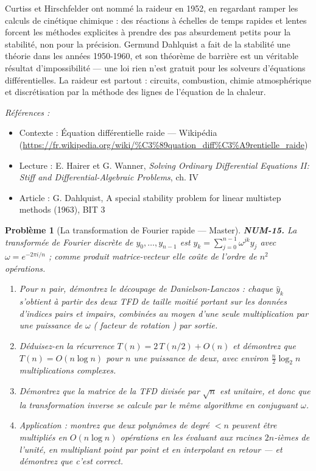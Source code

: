 \documentclass[11pt]{article}
\newtheorem{problem}{Problème}
\newenvironment{refs}{\par\small\noindent\emph{Références :}\begin{itemize}\setlength\itemsep{0pt}}{\end{itemize}\normalsize}
\begin{document}
\noindent Curtiss et Hirschfelder ont nommé la raideur en 1952, en regardant
ramper les calculs de cinétique chimique : des réactions à échelles de temps rapides et
lentes forcent les méthodes explicites à prendre des pas absurdement petits pour la
stabilité, non pour la précision. Germund Dahlquist a fait de la stabilité une théorie
dans les années 1950-1960, et son théorème de barrière est un véritable résultat
d'impossibilité --- une loi \og{} rien n'est gratuit \fg{} pour les solveurs d'équations
différentielles. La raideur est partout : circuits, combustion, chimie atmosphérique et
discrétisation par la méthode des lignes de l'équation de la chaleur.

\begin{refs}
\item Contexte : Équation différentielle raide --- Wikipédia (\url{https://fr.wikipedia.org/wiki/%C3%89quation_diff%C3%A9rentielle_raide})
\item Lecture : E. Hairer et G. Wanner, \textit{Solving Ordinary Differential Equations II: Stiff and Differential-Algebraic Problems}, ch. IV
\item Article : G. Dahlquist, \og{} A special stability problem for linear multistep methods \fg{} (1963), BIT 3
\end{refs}

\bigskip

\begin{problem}[{La transformation de Fourier rapide --- Master}]
\textbf{NUM-15.} La transformée de Fourier discrète de
$y_0, \ldots, y_{n-1}$ est $\hat{y}_k = \sum_{j=0}^{n-1} \omega^{jk} y_j$ avec
$\omega = e^{-2\pi i/n}$ ; comme produit matrice-vecteur elle coûte de l'ordre de
$n^2$ opérations.
\begin{enumerate}
\item[(a)] Pour $n$ pair, démontrez le découpage de Danielson-Lanczos : chaque
$\hat{y}_k$ s'obtient à partir des deux TFD de taille moitié portant sur les données
d'indices pairs et impairs, combinées au moyen d'une seule multiplication par une
puissance de $\omega$ (\og{} facteur de rotation \fg{}) par sortie.
\item[(b)] Déduisez-en la récurrence
$T(n) = 2\,T(n/2) + O(n)$ et démontrez que $T(n) = O(n \log n)$ pour $n$ une
puissance de deux, avec environ $\tfrac{n}{2}\log_2 n$ multiplications
complexes.
\item[(c)] Démontrez que la
matrice de la TFD divisée par $\sqrt{n}$ est unitaire, et donc que la transformation
inverse se calcule par le même algorithme en conjuguant $\omega$.
\item[(d)] Application : montrez que deux polynômes de degré $< n$ peuvent être multipliés
en $O(n \log n)$ opérations en les évaluant aux racines $2n$-ièmes de l'unité, en
multipliant point par point et en interpolant en retour --- et démontrez que c'est
correct.
\end{enumerate}

\end{problem}
\end{document}
